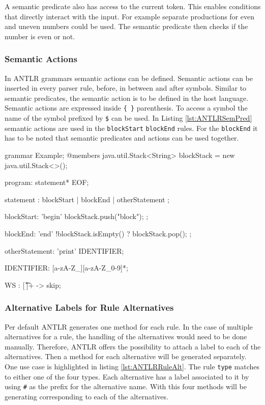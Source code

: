 A semantic predicate also has access to the current token. This enables conditions that directly interact with the input. For example separate productions for even and uneven numbers could be used. The semantic predicate then checks if the number is even or not.  


\subsubsection{Semantic Actions}

In ANTLR grammars semantic actions can be defined. Semantic actions can be inserted in every parser rule, before, in between and after symbols. Similar to semantic predicates, the semantic action is to be defined in the host language. Semantic actions are expressed inside \verb|{ }| parenthesis. To access a symbol the name of the symbol prefixed by \verb|$| can be used. In Listing \ref{lst:ANTLRSemPred} semantic actions are used in the \texttt{blockStart} \texttt{blockEnd} rules. For the \texttt{blockEnd} it has to be noted that semantic predicates and actions can be used together. 


\begin{AntlrCode}[float,numbers=none,caption=Example grammar using a semantic predicate and a semantic action., label=lst:ANTLRSemPred]
grammar Example;
@members {
    java.util.Stack<String> blockStack = new java.util.Stack<>();
}

program: statement* EOF;

statement
    : blockStart
    | blockEnd
    | otherStatement
    ;

blockStart: 'begin' { blockStack.push("block"); };

blockEnd: 'end' { !blockStack.isEmpty() }? { blockStack.pop(); };

otherStatement: 'print' IDENTIFIER;

IDENTIFIER: [a-zA-Z_][a-zA-Z_0-9]*;

WS  : [ \t\r\n]+ -> skip;
\end{AntlrCode}


\subsubsection{Alternative Labels for Rule Alternatives}

Per default ANTLR generates one method for each rule. In the case of multiple alternatives for a rule, the handling of the alternatives would need to be done manually. Therefore, ANTLR offers the possibility to attach a label to each of the alternatives. Then a method for each alternative will be generated separately. One use case is highlighted in listing \ref{lst:ANTLRRuleAlt}. The rule \texttt{type} matches to either one of the four types. Each alternative has a label associated to it by using \verb|#| as the prefix for the alternative name. With this four methods will be generating corresponding to each of the alternatives.     

